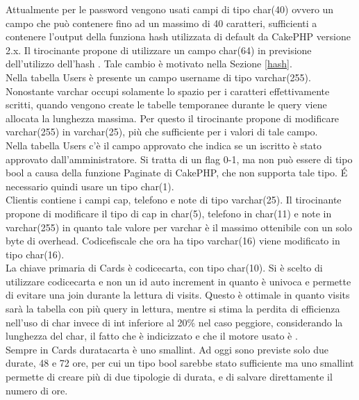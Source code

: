 Attualmente per le password vengono usati campi di tipo char(40) ovvero un campo che può contenere fino ad un massimo di 40 caratteri, sufficienti a contenere l'output della funziona hash  utilizzata di default da CakePHP versione 2.x. Il tirocinante propone di utilizzare un campo char(64) in previsione dell'utilizzo dell'hash . Tale cambio è motivato nella Sezione \ref{hash}. \\

Nella tabella Users è presente un campo username di tipo varchar(255). Nonostante varchar occupi solamente lo spazio per i caratteri effettivamente scritti, quando vengono create le tabelle temporanee durante le query viene allocata la lunghezza massima. Per questo il tirocinante propone di modificare varchar(255) in varchar(25), più che sufficiente per i valori di tale campo. \\

Nella tabella Users c'è il campo approvato che indica se un iscritto è stato approvato dall'amministratore. Si tratta di un flag 0-1, ma non può essere di tipo bool a causa della funzione Paginate di CakePHP, che non supporta tale tipo. \'E necessario quindi usare un tipo char(1). \\

Clientis contiene i campi cap, telefono e note di tipo varchar(25). Il tirocinante propone di modificare il tipo di cap in char(5), telefono in char(11) e note in varchar(255) in quanto tale valore per varchar è il massimo ottenibile con un solo byte di overhead. Codicefiscale che ora ha tipo varchar(16) viene modificato in tipo char(16). \\

La chiave primaria di Cards è codicecarta, con tipo char(10). Si è scelto di utilizzare codicecarta e non un id auto increment in quanto è univoca e permette di evitare una join durante la lettura di visits. Questo è ottimale in quanto visits sarà la tabella con più query in lettura, mentre si stima la perdita di efficienza nell'uso di char invece di int inferiore al 20\% nel caso peggiore, considerando la lunghezza del char, il fatto che è indicizzato e che il motore usato è . \\

Sempre in Cards duratacarta è uno smallint. Ad oggi sono previste solo due durate, 48 e 72 ore, per cui un tipo bool sarebbe stato sufficiente ma uno smallint permette di creare più di due tipologie di durata, e di salvare direttamente il numero di ore. \\

